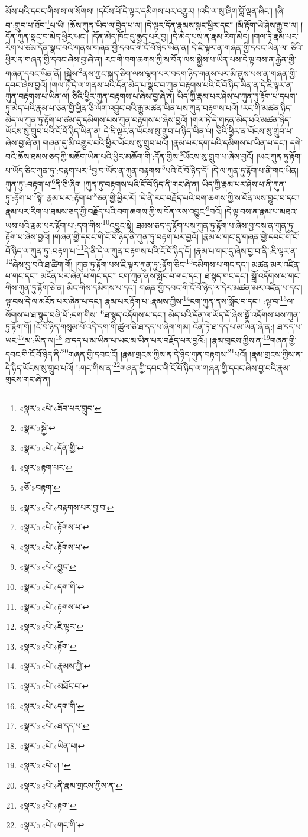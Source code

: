 མོས་པའི་དབང་གིས་ས་ལ་སོགས། །དངོས་པོ་དེ་ལྟར་དམིགས་པར་འགྱུར། །འདི་ལ་སུ་ཞིག་བློ་ལྡན་ཞིང་། །ཞི་བ་:གྲུབ་པ་ཐོབ་\footnote{«སྣར་»«པེ་»ཟོབ་པར་གྲུབ་}པ་ཡི། །ཆོས་ཀུན་ཡིད་ལ་བྱེད་པ་ལ། །དེ་ལྟར་དོན་རྣམས་སྣང་ཕྱིར་དང་། །མི་རྟོག་ཡེ་ཤེས་རྒྱུ་བ་ལ། །དོན་ཀུན་སྣང་བ་མེད་ཕྱིར་ཡང་། །དོན་མེད་ཁོང་དུ་ཆུད་པར་བྱ། །དེ་མེད་པས་ན་རྣམ་རིག་མེད། །གལ་ཏེ་རྣམ་པར་རིག་པ་ཙམ་དོན་སྣང་བའི་གནས་གཞན་གྱི་དབང་གི་ངོ་བོ་ཉིད་ཡིན་ན། དེ་ཇི་ལྟར་ན་གཞན་གྱི་དབང་ཡིན་ལ། ཅིའི་ཕྱིར་ན་གཞན་གྱི་དབང་ཞེས་བྱ་ཞེ་ན། རང་གི་བག་ཆགས་ཀྱི་ས་བོན་ལས་སྐྱེས་པ་ཡིན་པས་དེ་ལྟ་བས་ན་རྐྱེན་གྱི་གཞན་དབང་ཡིན་ནོ། །སྐྱེས་\footnote{«སྣར་»སྐྱེ་}ནས་ཀྱང་སྐད་ཅིག་ལས་ལྷག་པར་བདག་ཉིད་གནས་པར་མི་ནུས་པས་ན་གཞན་གྱི་དབང་ཞེས་བྱའོ། །གལ་ཏེ་དེ་ལ་གནས་པའི་དོན་མེད་པ་སྣང་བ་ཀུན་བརྟགས་པའི་ངོ་བོ་ཉིད་ཡིན་ན་དེ་ཇི་ལྟར་ན་ཀུན་བརྟགས་པ་ཡིན་ལ། ཅིའི་ཕྱིར་ཀུན་བརྟགས་པ་ཞེས་བྱ་ཞེ་ན། ཡིད་ཀྱི་རྣམ་པར་ཤེས་པ་ཀུན་ཏུ་རྟོག་པ་དཔག་ཏུ་མེད་པའི་རྣམ་པ་ཅན་གྱི་ཕྱིན་ཅི་ལོག་འབྱུང་བའི་རྒྱུ་མཚན་ཡིན་པས་ཀུན་བརྟགས་པའོ། །རང་གི་མཚན་ཉིད་མེད་ལ་ཀུན་ཏུ་རྟོག་པ་ཙམ་དུ་དམིགས་པས་ཀུན་བརྟགས་པ་ཞེས་བྱའོ། །གལ་ཏེ་དེ་གཏན་མེད་པའི་མཚན་ཉིད་ཡོངས་སུ་གྲུབ་པའི་ངོ་བོ་ཉིད་ཡིན་ན། དེ་ཇི་ལྟར་ན་ཡོངས་སུ་གྲུབ་པ་ཉིད་ཡིན་ལ། ཅིའི་ཕྱིར་ན་ཡོངས་སུ་གྲུབ་པ་ཞེས་བྱ་ཞེ་ན། གཞན་དུ་མི་འགྱུར་བའི་ཕྱིར་ཡོངས་སུ་གྲུབ་པའོ། །རྣམ་པར་དག་པའི་དམིགས་པ་ཡིན་པ་དང་། དགེ་བའི་ཆོས་ཐམས་ཅད་ཀྱི་མཆོག་ཡིན་པའི་ཕྱིར་མཆོག་གི་:དོན་གྱིས་\footnote{«སྣར་»«པེ་»དོན་གྱི་}ཡོངས་སུ་གྲུབ་པ་ཞེས་བྱའོ། །ཡང་ཀུན་ཏུ་རྟོག་པ་ཡོད་ཅིང་ཀུན་ཏུ་:བརྟག་པར་\footnote{«སྣར་»རྟག་པར་}བྱ་བ་ཡོད་ན་ཀུན་བརྟགས་\footnote{«ཅོ་»བརྟག་}པའི་ངོ་བོ་ཉིད་དོ། །དེ་ལ་ཀུན་ཏུ་རྟོག་པ་ནི་གང་ཡིན། ཀུན་ཏུ་:བརྟག་པ་\footnote{«སྣར་»«པེ་»བརྟགས་པར་བྱ་བ་}ནི་ཅི་ཞིག །ཀུན་ཏུ་བརྟགས་པའི་ངོ་བོ་ཉིད་ནི་གང་ཞེ་ན། ཡིད་ཀྱི་རྣམ་པར་ཤེས་པ་ནི་ཀུན་ཏུ་:རྟོག་པ་\footnote{«སྣར་»«པེ་»རྟོགས་པ་}སྟེ། རྣམ་པར་:རྟོག་པ་\footnote{«སྣར་»«པེ་»རྟོགས་པ་}ཅན་གྱི་ཕྱིར་རོ། །དེ་ནི་རང་བརྗོད་པའི་བག་ཆགས་ཀྱི་ས་བོན་ལས་བྱུང་བ་དང་། རྣམ་པར་རིག་པ་ཐམས་ཅད་ཀྱི་བརྗོད་པའི་བག་ཆགས་ཀྱི་ས་བོན་ལས་འབྱུང་\footnote{«སྣར་»«པེ་»བྱུང་}བའོ། །དེ་ལྟ་བས་ན་རྣམ་པ་མཐའ་ཡས་པའི་རྣམ་པར་རྟོག་པ་:དག་གིས་\footnote{«སྣར་»«པེ་»དག་གི་}འབྱུང་སྟེ། ཐམས་ཅད་དུ་རྟོག་པས་ཀུན་ཏུ་རྟོག་པ་ཞེས་བྱ་བས་ན་ཀུན་ཏུ་རྟོག་པ་ཞེས་བྱའོ། །གཞན་གྱི་དབང་གི་ངོ་བོ་ཉིད་ནི་ཀུན་ཏུ་བརྟག་པར་བྱའོ། །རྣམ་པ་གང་དུ་གཞན་གྱི་དབང་གི་ངོ་བོ་ཉིད་ལ་ཀུན་ཏུ་:བརྟག་པ་\footnote{«སྣར་»«པེ་»རྟགས་པ་}དེ་ནི་དེ་ལ་ཀུན་བརྟགས་པའི་ངོ་བོ་ཉིད་དོ། །རྣམ་པ་གང་དུ་ཞེས་བྱ་བ་ནི་:ཇི་ལྟར་ན་\footnote{«སྣར་»«པེ་»ཇི་ལྟར་}ཞེས་བྱ་བའི་ཐ་ཚིག་གོ། །ཀུན་ཏུ་རྟོག་པས་ཇི་ལྟར་ཀུན་ཏུ་:རྟོག་ཅིང་\footnote{«སྣར་»«པེ་»རྟོག་}དམིགས་པ་གང་དང་། མཚན་མར་འཛིན་པ་གང་དང་། མངོན་པར་ཞེན་པ་གང་དང་། ངག་ཀུན་ནས་སློང་བ་གང་དང་། ཐ་སྙད་གང་དང་། སྒྲོ་འདོགས་པ་གང་གིས་ཀུན་ཏུ་རྟོག་ཅེ་ན། མིང་གིས་དམིགས་པ་དང་། གཞན་གྱི་དབང་གི་ངོ་བོ་ཉིད་ལ་དེར་མཚན་མར་འཛིན་པ་དང་། ལྟ་བས་དེ་ལ་མངོན་པར་ཞེན་པ་དང་། རྣམ་པར་རྟོག་པ་:རྣམས་ཀྱིས་\footnote{«སྣར་»«པེ་»རྣམས་ཀྱི་}ངག་ཀུན་ནས་སློང་བ་དང་། :ལྟ་བ་\footnote{«སྣར་»«པེ་»མཐོང་བ་}ལ་སོགས་པ་ཐ་སྙད་བཞི་པོ་:དག་གིས་\footnote{«སྣར་»«པེ་»དག་གི་}ཐ་སྙད་འདོགས་པ་དང་། མེད་པའི་དོན་ལ་ཡོད་དོ་ཞེས་སྒྲོ་འདོགས་པས་ཀུན་ཏུ་རྟོག་གོ། །ངོ་བོ་ཉིད་གསུམ་པོ་འདི་དག་གི་ཚུལ་ཅི་ཐ་དད་པ་ཞིག་གམ། འོན་ཏེ་ཐ་དད་པ་མ་ཡིན་ཞེ་ན:། ཐ་དད་པ་ཡང་\footnote{«སྣར་»«པེ་»ཐ་དད་པ་}མ་:ཡིན་ལ།\footnote{«སྣར་»«པེ་»ཡིན་པ།} ཐ་དད་པ་མ་ཡིན་པ་ཡང་མ་ཡིན་པར་བརྗོད་པར་བྱའོ:། །རྣམ་གྲངས་ཀྱིས་ན་\footnote{«སྣར་»«པེ་»། །}གཞན་གྱི་དབང་གི་ངོ་བོ་ཉིད་ནི་\footnote{«སྣར་»«པེ་»ནི་རྣམ་གྲངས་ཀྱིས་ན་}གཞན་གྱི་དབང་ངོ། །རྣམ་གྲངས་ཀྱིས་ན་དེ་ཉིད་ཀུན་བརྟགས་\footnote{«སྣར་»«པེ་»རྟག་}པའོ། །རྣམ་གྲངས་ཀྱིས་ན་དེ་ཉིད་ཡོངས་སུ་གྲུབ་པའོ། །:གང་གིས་ན་\footnote{«སྣར་»«པེ་»གང་གི་}གཞན་གྱི་དབང་གི་ངོ་བོ་ཉིད་ལ་གཞན་གྱི་དབང་ཞེས་བྱ་བའི་རྣམ་གྲངས་གང་ཞེ་ན། 
